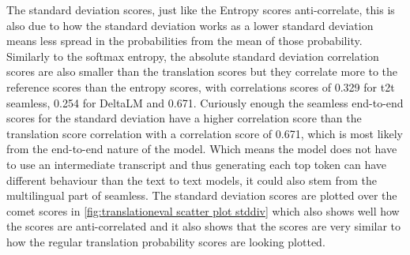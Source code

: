 The standard deviation scores, just like the Entropy scores anti-correlate, this is also due to how the standard deviation works as a lower standard deviation means less spread in the probabilities from the mean of those probability. 
Similarly to the softmax entropy, the absolute standard deviation correlation scores are also smaller than the translation scores but they correlate more to the reference scores than the entropy scores, with correlations scores of 0.329 for t2t seamless, 0.254 for DeltaLM and 0.671.
Curiously enough the seamless end-to-end scores for the standard deviation have a higher correlation score than the translation score correlation with a correlation score of 0.671, which is most likely from the end-to-end nature of the model. Which means the model does not have to use an intermediate transcript and thus generating each top token can have different behaviour than the text to text models, it could also stem from the multilingual part of seamless. 
The standard deviation scores are plotted over the comet scores in \autoref{fig:translationeval scatter plot stddiv} which also shows well how the scores are anti-correlated and it also shows that the scores are very similar to how the regular translation probability scores are looking plotted. 
